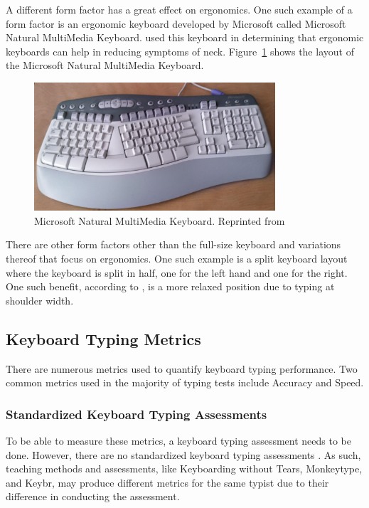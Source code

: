 \documentclass{report}
\begin{document}
A different form factor has a great effect on ergonomics. One such example of a
form factor is an ergonomic keyboard developed by Microsoft called Microsoft
Natural MultiMedia Keyboard. \citeauthor{ripat2010} used this keyboard in
determining that ergonomic keyboards can help in reducing symptoms of \ac{neck}.
Figure~\ref{fig:mn} shows the layout of the Microsoft Natural MultiMedia
Keyboard.

\begin{figure}[H]
	\centering
	\includegraphics[width=0.8\textwidth]{mn.png}
	\caption{Microsoft Natural MultiMedia Keyboard. Reprinted from }
	\label{fig:mn}
	\centering
\end{figure}

There are other form factors other than the full-size keyboard and variations
thereof that focus on ergonomics. One such example is a split keyboard layout
where the keyboard is split in half, one for the left hand and one for the
right. One such benefit, according to \citeauthor{ergodox}, is a more relaxed
position due to typing at shoulder width.

\subsection{Keyboard Typing Metrics}

There are numerous metrics used to quantify keyboard typing performance. Two
common metrics used in the majority of typing tests include Accuracy and Speed.

\subsubsection{Standardized Keyboard Typing Assessments}

To be able to measure these metrics, a keyboard typing assessment needs to be
done. However, there are no standardized keyboard typing assessments
\parencite{donica2018}. As such, teaching methods and assessments, like
Keyboarding without Tears, Monkeytype, and Keybr, may produce different metrics
for the same typist due to their difference in conducting the assessment.
\end{document}
